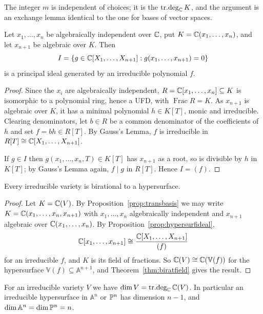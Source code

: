 \documentclass[a4paper]{scrartcl}
\newcommand{\A}{\mathbb{A}}
\newcommand{\V}{\mathbb{V}}
\newcommand{\Frac}{\operatorname{Frac}}
\DeclareMathOperator{\trdeg}{tr.deg}
\begin{document}
The integer $m$ is independent of choices; it is the  $\trdeg_\C K$, and the argument is an exchange lemma identical to the one for bases of vector spaces.

\begin{proposition}\label{prop:hypersurfideal}
	Let $x_1,\dots,x_n$ be algebraically independent over $\mathbb{C}$, put $K = \mathbb{C}(x_1,\dots,x_n)$, and let $x_{n+1}$ be algebraic over $K$. Then
	$$I = \{g \in \mathbb{C}[X_1,\dots,X_{n+1}] : g(x_1,\dots,x_{n+1}) = 0\}$$
	is a principal ideal generated by an irreducible polynomial $f$.
\end{proposition}

\begin{proof}
	Since the $x_i$ are algebraically independent, $R = \mathbb{C}[x_1,\dots,x_n] \subseteq K$ is isomorphic to a polynomial ring, hence a UFD, with $\Frac R = K$. As $x_{n+1}$ is algebraic over $K$, it has a minimal polynomial $h \in K[T]$, monic and irreducible. Clearing denominators, let $b \in R$ be a common denominator of the coefficients of $h$ and set $f = bh \in R[T]$. By Gauss's Lemma, $f$ is irreducible in $R[T] \cong \mathbb{C}[X_1,\dots,X_{n+1}]$.

	If $g \in I$ then $g(x_1,\dots,x_n,T) \in K[T]$ has $x_{n+1}$ as a root, so is divisible by $h$ in $K[T]$; by Gauss's Lemma again, $f \mid g$ in $R[T]$. Hence $I = (f)$.
\end{proof}

\begin{corollary}\label{cor:birathyp}
	Every irreducible variety is birational to a hypersurface.
\end{corollary}

\begin{proof}
	Let $K = \mathbb{C}(V)$. By Proposition~\ref{prop:transbasis} we may write $K = \mathbb{C}(x_1,\dots,x_n,x_{n+1})$ with $x_1,\dots,x_n$ algebraically independent and $x_{n+1}$ algebraic over $\mathbb{C}(x_1,\dots,x_n)$. By Proposition~\ref{prop:hypersurfideal},
	$$\mathbb{C}[x_1,\dots,x_{n+1}] \cong \frac{\mathbb{C}[X_1,\dots,X_{n+1}]}{(f)}$$
	for an irreducible $f$, and $K$ is its field of fractions. So $\C(V) \cong \C(\V(f))$ for the hypersurface $\V(f) \subseteq \A^{n+1}$, and Theorem~\ref{thm:biratfield} gives the result.
\end{proof}

\begin{corollary}\label{cor:dimtrdeg}
	For an irreducible variety $V$ we have $\dim V = \trdeg_\C \C(V)$. In particular an irreducible hypersurface in $\A^n$ or $\mathbb{P}^n$ has dimension $n-1$, and $\dim \A^n = \dim\PP^n = n$.
\end{corollary}
\end{document}
